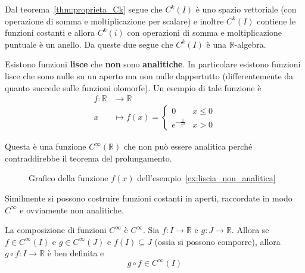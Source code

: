 Dal teorema~\ref{thm:proprieta_Ck} segue che \(C^{k}{(I)}\) è uno spazio
vettoriale (con operazione di somma e moltiplicazione per scalare) e inoltre
\(C^{k} {(I)}\) contiene le funzioni costanti e allora \(C^{k}{(i)}\) con
operazioni di somma e moltiplicazione puntuale è un anello. Da queste due segue
che \(C^{k}{(I)}\) è una \(\mathbb{R}\)-algebra.

\begin{example}\label{ex:liscia_non_analitica}
    Esistono funzioni \textbf{lisce} che \textbf{non} sono \textbf{analitiche}.
    In particolare esistono funzioni lisce che sono nulle su un aperto ma non
    nulle dappertutto (differentemente da quanto succede sulle funzioni
    olomorfe). Un esempio di tale funzione è 
    \begin{align*}
        f : \mathbb{R} &\longrightarrow \mathbb{R} \\
        x &\longmapsto f (x) = \begin{cases}
            0 & x \le 0 \\
            e^{-\frac{1}{x^2}} & x > 0
        \end{cases}
    \end{align*}
    
    Questa è una funzione \(C^{\infty}{(\mathbb{R})}\) che non può essere
    analitica perché contraddirebbe il teorema del prolungamento.
    \begin{figure}[ht]
        \centering
        \caption{Grafico della funzione \(f(x)\)
        dell'esempio~\ref{ex:liscia_non_analitica}}\label{fig:liscia_non_analitica} 
    \end{figure}
    Similmente si possono costruire funzioni costanti in aperti, raccordate in
    modo \(C^{\infty}\) e ovviamente non analitiche.
\end{example}
\begin{proposition}[Composizione]\label{prp:composizione_ck}
    La composizione di funzioni \(C^{\infty}\) è \(C^{\infty}\). Sia \(f : I \to
    \mathbb{R}\) e \(g : J \to \mathbb{R}\). Allora se \(f \in C^{\infty}{(I)}\)
    e \(g \in C^{\infty}{(J)}\) e \(f{(I)} \subseteq J \) (ossia si possono
    comporre), allora \(g \circ f : I \to \mathbb{R}\) è ben definita e 
    \[
        g \circ f \in C^{\infty}{(I)}
    \]
\end{proposition}
